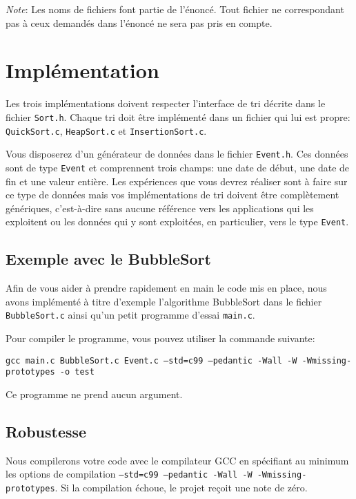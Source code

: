 \documentclass[a4paper,10pt]{article}
\begin{document}
{\em Note}: Les noms de fichiers font partie de l'énoncé. Tout fichier ne
correspondant pas à ceux demandés dans l'énoncé ne sera pas pris en compte.

\section{Implémentation}

Les trois implémentations doivent respecter l'interface de tri décrite dans le
fichier \texttt{Sort.h}. Chaque tri doit être implémenté dans un fichier qui lui
est propre: \texttt{QuickSort.c}, \texttt{HeapSort.c} et
\texttt{InsertionSort.c}.

Vous disposerez d'un générateur de données dans le fichier \texttt{Event.h}. Ces
données sont de type \texttt{Event} et comprennent trois champs: une date de
début, une date de fin et une valeur entière. Les expériences que vous devrez
réaliser sont à faire sur ce type de données mais vos implémentations de tri
doivent être complètement génériques, c'est-à-dire sans aucune référence vers
les applications qui les exploitent ou les données qui y sont exploitées, en
particulier, vers le type \texttt{Event}.

\subsection*{Exemple avec le BubbleSort}

Afin de vous aider à prendre rapidement en main le code mis en place, nous avons
implémenté à titre d'exemple l'algorithme BubbleSort dans le fichier
\texttt{BubbleSort.c} ainsi qu'un petit programme d'essai \texttt{main.c}.

Pour compiler le programme, vous pouvez utiliser la commande suivante:

{\small \texttt{gcc main.c BubbleSort.c Event.c --std=c99 --pedantic -Wall -W -Wmissing-prototypes -o test}}

Ce programme ne prend aucun argument.

\subsection*{Robustesse}

Nous compilerons votre code avec le compilateur GCC en spécifiant au
minimum les options de compilation \texttt{--std=c99 --pedantic -Wall -W -Wmissing-
prototypes}. Si la compilation échoue, le projet reçoit une note de zéro.
\end{document}
